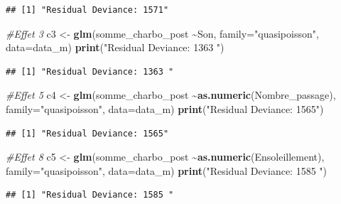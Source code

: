 \documentclass[
  french,
]{article}
\newenvironment{Shaded}{\begin{snugshade}}{\end{snugshade}}
\newcommand{\AttributeTok}[1]{\textcolor[rgb]{0.13,0.29,0.53}{#1}}
\newcommand{\CommentTok}[1]{\textcolor[rgb]{0.56,0.35,0.01}{\textit{#1}}}
\newcommand{\FunctionTok}[1]{\textcolor[rgb]{0.13,0.29,0.53}{\textbf{#1}}}
\newcommand{\NormalTok}[1]{#1}
\newcommand{\OtherTok}[1]{\textcolor[rgb]{0.56,0.35,0.01}{#1}}
\newcommand{\SpecialCharTok}[1]{\textcolor[rgb]{0.81,0.36,0.00}{\textbf{#1}}}
\newcommand{\StringTok}[1]{\textcolor[rgb]{0.31,0.60,0.02}{#1}}
\begin{document}
\begin{verbatim}
## [1] "Residual Deviance: 1571"
\end{verbatim}

\begin{Shaded}
\begin{Highlighting}[]
\CommentTok{\#Effet 3}
\NormalTok{c3 }\OtherTok{\textless{}{-}} \FunctionTok{glm}\NormalTok{(somme\_charbo\_post }\SpecialCharTok{\textasciitilde{}}\NormalTok{Son, }\AttributeTok{family=}\StringTok{"quasipoisson"}\NormalTok{, }\AttributeTok{data=}\NormalTok{data\_m)}
\FunctionTok{print}\NormalTok{(}\StringTok{"Residual Deviance: 1363 "}\NormalTok{)}
\end{Highlighting}
\end{Shaded}

\begin{verbatim}
## [1] "Residual Deviance: 1363 "
\end{verbatim}

\begin{Shaded}
\begin{Highlighting}[]
\CommentTok{\#Effet 5}
\NormalTok{c4 }\OtherTok{\textless{}{-}} \FunctionTok{glm}\NormalTok{(somme\_charbo\_post }\SpecialCharTok{\textasciitilde{}}\FunctionTok{as.numeric}\NormalTok{(Nombre\_passage), }\AttributeTok{family=}\StringTok{"quasipoisson"}\NormalTok{, }\AttributeTok{data=}\NormalTok{data\_m)}
\FunctionTok{print}\NormalTok{(}\StringTok{"Residual Deviance: 1565"}\NormalTok{)}
\end{Highlighting}
\end{Shaded}

\begin{verbatim}
## [1] "Residual Deviance: 1565"
\end{verbatim}

\begin{Shaded}
\begin{Highlighting}[]
\CommentTok{\#Effet 8}
\NormalTok{c5 }\OtherTok{\textless{}{-}} \FunctionTok{glm}\NormalTok{(somme\_charbo\_post }\SpecialCharTok{\textasciitilde{}}\FunctionTok{as.numeric}\NormalTok{(Ensoleillement), }\AttributeTok{family=}\StringTok{"quasipoisson"}\NormalTok{, }\AttributeTok{data=}\NormalTok{data\_m)}
\FunctionTok{print}\NormalTok{(}\StringTok{"Residual Deviance: 1585 "}\NormalTok{)}
\end{Highlighting}
\end{Shaded}

\begin{verbatim}
## [1] "Residual Deviance: 1585 "
\end{verbatim}
\end{document}

